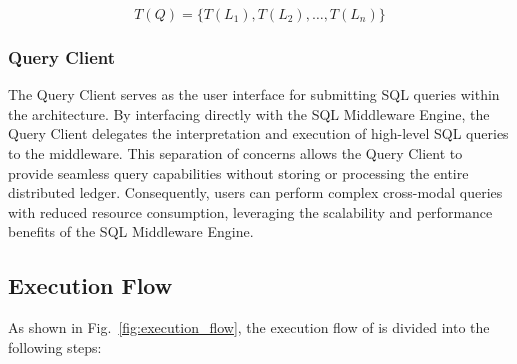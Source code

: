 \begin{equation}
T(Q) = \{ T(L_1), T(L_2), \ldots, T(L_n) \}
\end{equation}


\subsubsection{Query Client}
The Query Client serves as the user interface for submitting SQL queries within the \Chain architecture. 
By interfacing directly with the SQL Middleware Engine, the Query Client delegates the interpretation and execution of high-level SQL queries to the middleware. 
This separation of concerns allows the Query Client to provide seamless query capabilities without storing or processing the entire distributed ledger. 
Consequently, users can perform complex cross-modal queries with reduced resource consumption, leveraging the scalability and performance benefits of the SQL Middleware Engine.


\subsection{Execution Flow}
As shown in Fig.~\ref{fig:execution_flow}, the execution flow of \Chain is divided into the following steps: 


